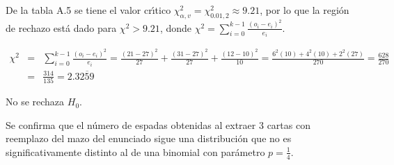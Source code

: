 \begin{solucion}
 \begin{region}
  De la tabla A.5 se tiene el valor cr\'{\i}tico
  $\chi^2_{\alpha,v} = \chi^2_{0.01,2} \approx 9.21$,
  por lo que la regi\'on de rechazo est\'a dado
  para $\chi^2 > 9.21$, donde
  $\chi^2 = \sum_{i=0}^{k-1} \frac{\left( o_i - e_i \right)^2}{e_i}$.
 \end{region}

 \begin{estadistico}
  \begin{eqnarray*}
   \chi^2 & = & \sum_{i=0}^{k-1} \frac{\left( o_i - e_i \right)^2}{e_i}
   = \frac{(21-27)^2}{27} + \frac{(31-27)^2}{27} + \frac{(12-10)^2}{10}
   = \frac{6^2(10) + 4^2(10) + 2^2(27)}{270} = \frac{628}{270} \\
   & = & \frac{314}{135} = 2.3\overline{259}
  \end{eqnarray*}
 \end{estadistico}

 \begin{decision}
  No se rechaza $H_0$.
 \end{decision}

 \begin{conclusion}
  Se confirma que el n\'umero de espadas obtenidas al extraer $3$ cartas
  con reemplazo del mazo del enunciado sigue una distribuci\'on
  que no es significativamente distinto al de una binomial
  con par\'ametro $p = \frac{1}{4}$.
 \end{conclusion}


\end{solucion}
